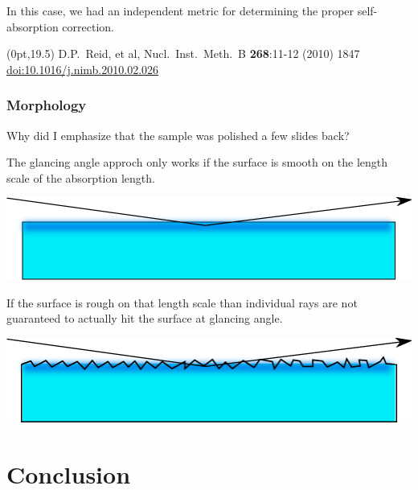 \documentclass[10pt, xcolor=x11names, compress, handout]{beamer}
\begin{document}
\begin{frame}
  \medskip

  \begin{exampleblock}{}
    In this case, we had an independent metric for determining the
    proper self-absorption correction.
  \end{exampleblock}
  \begin{textblock*}{0.5\linewidth}(0pt,19.5\TPVertModule)
    \tiny%
    D.P.~Reid, et al, Nucl.\ Inst.\ Meth.\ B \textbf{268}:11-12 (2010)
    1847
    \href{http://dx.doi.org10.1016/j.nimb.2010.02.026}
    {\color{Blue2}doi:10.1016/j.nimb.2010.02.026}
  \end{textblock*}
\end{frame}

\begin{frame}
  \frametitle{Morphology}
  \begin{exampleblock}{}
    Why did I emphasize that the sample was polished a few slides back?
  \end{exampleblock}

  The glancing angle approch only works if the surface is smooth on
  the length scale of the absorption length.
  \begin{center}
    \includegraphics[width=0.8\linewidth]{images/smooth.pdf}
  \end{center}

  If the surface is rough on that length scale than individual rays
  are not guaranteed to actually hit the surface at glancing angle.
  \begin{center}
    \includegraphics[width=0.8\linewidth]{images/rough.pdf}
  \end{center}


\end{frame}

\section{Conclusion}
\end{document}
